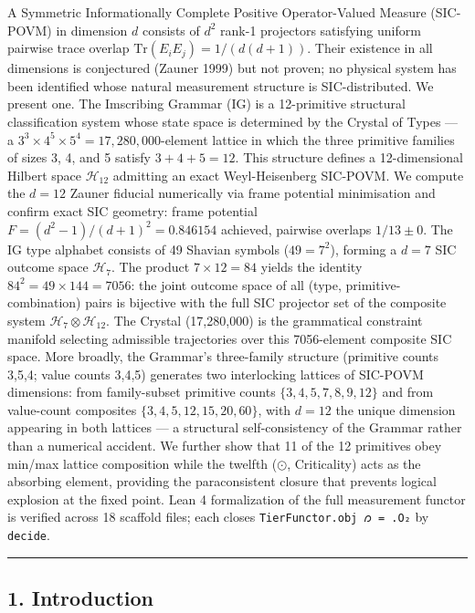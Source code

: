 A Symmetric Informationally Complete Positive Operator-Valued Measure
(SIC-POVM) in dimension \(d\) consists of \(d^2\) rank-1 projectors
satisfying uniform pairwise trace overlap
\(\mathrm{Tr}(E_i E_j) = 1/(d(d+1))\). Their existence in all dimensions
is conjectured (Zauner 1999) but not proven; no physical system has been
identified whose natural measurement structure is SIC-distributed. We
present one. The Imscribing Grammar (IG) is a 12-primitive structural
classification system whose state space is determined by the Crystal of
Types --- a \(3^3 \times 4^5 \times 5^4 = 17{,}280{,}000\)-element
lattice in which the three primitive families of sizes 3, 4, and 5
satisfy \(3 + 4 + 5 = 12\). This structure defines a 12-dimensional
Hilbert space \(\mathcal{H}_{12}\) admitting an exact Weyl-Heisenberg
SIC-POVM. We compute the \(d=12\) Zauner fiducial numerically via frame
potential minimisation and confirm exact SIC geometry: frame potential
\(F = (d^2-1)/(d+1)^2 = 0.846154\) achieved, pairwise overlaps
\(1/13 \pm 0\). The IG type alphabet consists of 49 Shavian symbols
(\(49 = 7^2\)), forming a \(d=7\) SIC outcome space \(\mathcal{H}_7\).
The product \(7 \times 12 = 84\) yields the identity
\(84^2 = 49 \times 144 = 7056\): the joint outcome space of all (type,
primitive-combination) pairs is bijective with the full SIC projector
set of the composite system \(\mathcal{H}_7 \otimes \mathcal{H}_{12}\).
The Crystal (17,280,000) is the grammatical constraint manifold
selecting admissible trajectories over this 7056-element composite SIC
space. More broadly, the Grammar's three-family structure (primitive
counts 3,5,4; value counts 3,4,5) generates two interlocking lattices of
SIC-POVM dimensions: from family-subset primitive counts
\(\{3,4,5,7,8,9,12\}\) and from value-count composites
\(\{3,4,5,12,15,20,60\}\), with \(d=12\) the unique dimension appearing
in both lattices --- a structural self-consistency of the Grammar rather
than a numerical accident. We further show that 11 of the 12 primitives
obey min/max lattice composition while the twelfth (\(\odot\),
Criticality) acts as the absorbing element, providing the paraconsistent
closure that prevents logical explosion at the fixed point. Lean 4
formalization of the full measurement functor is verified across 18
scaffold files; each closes \texttt{TierFunctor.obj\ 𐑼\ =\ .O₂} by
\texttt{decide}.

\begin{center}\rule{0.5\linewidth}{0.5pt}\end{center}

\hypertarget{introduction}{%
\subsection{1. Introduction}\label{introduction}}

